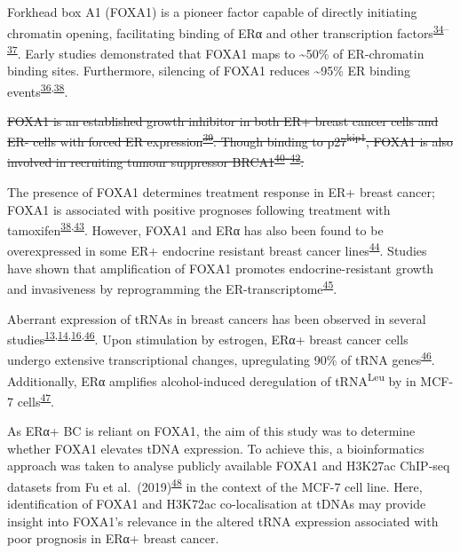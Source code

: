 \documentclass[
  12pt,
]{article}
\begin{document}
Forkhead box A1 (FOXA1) is a pioneer factor capable of directly initiating chromatin opening, facilitating binding of ERα and other transcription factors\textsuperscript{\protect\hyperlink{ref-Costa1989}{34}--\protect\hyperlink{ref-laganiuxe8re2005}{37}}.
Early studies demonstrated that FOXA1 maps to \textasciitilde50\% of ER-chromatin binding sites.
Furthermore, silencing of FOXA1 reduces \textasciitilde95\% ER binding events\textsuperscript{\protect\hyperlink{ref-carroll2005}{36},\protect\hyperlink{ref-Hurtado2011}{38}}.

\sout{FOXA1 is an established growth inhibitor in both ER+ breast cancer cells and ER- cells with forced ER expression\textsuperscript{\protect\hyperlink{ref-Wolf2007}{39}}. Though binding to p27\textsuperscript{kip1}, FOXA1 is also involved in recruiting tumour suppressor BRCA1\textsuperscript{\protect\hyperlink{ref-Williamson2006}{40}--\protect\hyperlink{ref-Fredersdorf1997}{42}}.}

The presence of FOXA1 determines treatment response in ER+ breast cancer; FOXA1 is associated with positive prognoses following treatment with tamoxifen\textsuperscript{\protect\hyperlink{ref-Hurtado2011}{38},\protect\hyperlink{ref-Badve2007}{43}}.
However, FOXA1 and ERα has also been found to be overexpressed in some ER+ endocrine resistant breast cancer lines\textsuperscript{\protect\hyperlink{ref-ross-innes2012}{44}}.
Studies have shown that amplification of FOXA1 promotes endocrine-resistant growth and invasiveness by reprogramming the ER-transcriptome\textsuperscript{\protect\hyperlink{ref-Fu2016}{45}}.

Aberrant expression of tRNAs in breast cancers has been observed in several studies\textsuperscript{\protect\hyperlink{ref-Zhang2018}{13},\protect\hyperlink{ref-Pavon-Eternod2009}{14},\protect\hyperlink{ref-Krishnan2016}{16},\protect\hyperlink{ref-Hah2011}{46}}.
Upon stimulation by estrogen, ERα+ breast cancer cells undergo extensive transcriptional changes, upregulating 90\% of tRNA genes\textsuperscript{\protect\hyperlink{ref-Hah2011}{46}}.
Additionally, ERα amplifies alcohol-induced deregulation of tRNA\textsuperscript{Leu} by in MCF-7 cells\textsuperscript{\protect\hyperlink{ref-zhong2014}{47}}.

As ERα+ BC is reliant on FOXA1, the aim of this study was to determine whether FOXA1 elevates tDNA expression.
To achieve this, a bioinformatics approach was taken to analyse publicly available FOXA1 and H3K27ac ChIP-seq datasets from Fu et al.~(2019)\textsuperscript{\protect\hyperlink{ref-fu2019}{48}} in the context of the MCF-7 cell line.
Here, identification of FOXA1 and H3K72ac co-localisation at tDNAs may provide insight into FOXA1's relevance in the altered tRNA expression associated with poor prognosis in ERα+ breast cancer.
\end{document}
